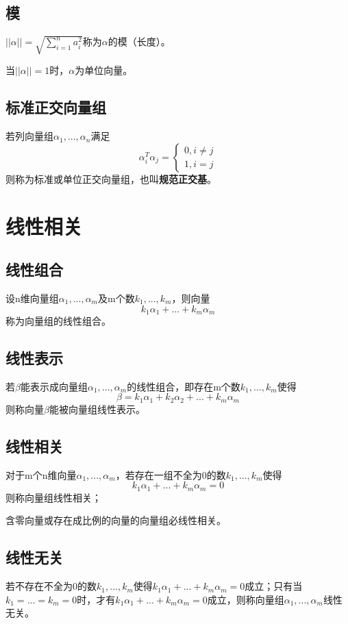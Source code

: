 \subsection{模}
\(||\alpha|| = \displaystyle \sqrt{\sum_{i = 1}^{n}a_i^2}\)称为\(\alpha\)的模（长度）。

当\(||\alpha|| = 1\)时，\(\alpha\)为单位向量。


\subsection{标准正交向量组}
若列向量组\(\alpha_1, ..., \alpha_n\)满足\[\alpha_i^T\alpha_j = 
\begin{cases}
0, i \neq j \\ 
1, i = j
\end{cases}
\]则称为标准或单位正交向量组，也叫\textbf{规范正交基}。


\section{线性相关}

\subsection{线性组合}
设n维向量组\(\alpha_1, ..., \alpha_m\)及m个数\(k_1, ..., k_m\)，则向量\[k_1\alpha_1 + ... + k_m\alpha_m\]
称为向量组的线性组合。


\subsection{线性表示}
若\(\beta\)能表示成向量组\(\alpha_1, ..., \alpha_m\)的线性组合，即存在m个数\(k_1, ..., k_m\)使得\[\beta = k_1\alpha_1 + k_2\alpha_2 + ... + k_m\alpha_m\]则称向量\(\beta\)能被向量组线性表示。


\subsection{线性相关}
对于m个n维向量\(\alpha_1, ..., \alpha_m\)，若存在一组不全为0的数\(k_1, ..., k_m\)使得\[k_1\alpha_1 + ... + k_m\alpha_m = 0\]则称向量组线性相关；

含零向量或存在成比例的向量的向量组必线性相关。


\subsection{线性无关}
若不存在不全为0的数\(k_1, ..., k_m\)使得\(k_1\alpha_1 + ... + k_m\alpha_m = 0\)成立；只有当\(k_1 = ... =k_m = 0\)时，才有\(k_1\alpha_1 + ... + k_m\alpha_m = 0\)成立，则称向量组\(\alpha_1, ..., \alpha_m\)线性无关。

